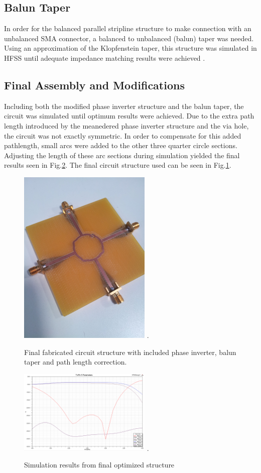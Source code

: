 \subsection{Balun Taper}
In order for the balanced parallel stripline structure to make connection with an unbalanced SMA connector, a balanced to unbalanced (balun) taper was needed. Using an approximation of the Klopfenstein taper, this structure was simulated in HFSS until adequate impedance matching results were achieved \cite{rizvi_klopfenstein_2012-1}.

\subsection{Final Assembly and Modifications}
Including both the modified phase inverter structure and the balun taper, the circuit was simulated until optimum results were achieved. Due to the extra path length introduced by the meanedered phase inverter structure and the via hole, the circuit was not exactly symmetric. In order to compensate for this added pathlength, small arcs were added to the other three quarter circle sections. Adjusting the length of these arc sections during simulation yielded the final results seen in Fig.\ref{fig_simresults}. The final circuit structure used can be seen in Fig.\ref{fig_final}.

 \begin{figure}[!t]
\centering
\includegraphics[width=2.5in]{finalfab.jpg}
\DeclareGraphicsExtensions.
\caption{Final fabricated circuit structure with included phase inverter, balun taper and path length correction.}
\label{fig_final}
\end{figure}

\begin{figure}[!t]
\centering
\includegraphics[width=2.5in]{finalsimresults.png}
\DeclareGraphicsExtensions.
\caption{Simulation results from final optimized structure}
\label{fig_simresults}
\end{figure}  

